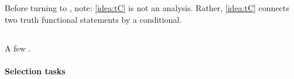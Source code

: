 \begin{note}
  Before turning to , note:
  \autoref{idea:tC} is not an analysis.
    Rather, \autoref{idea:tC} connects two truth functional statements by a conditional.
\end{note}



\subsection{}
\label{sec:illu3-1}

\begin{note}
  A few .
\end{note}


\paragraph*{Selection tasks}
\nocite{Wason:1968aa}
\nocite{Wason:1971aa}
\label{par:selection-tasks}

